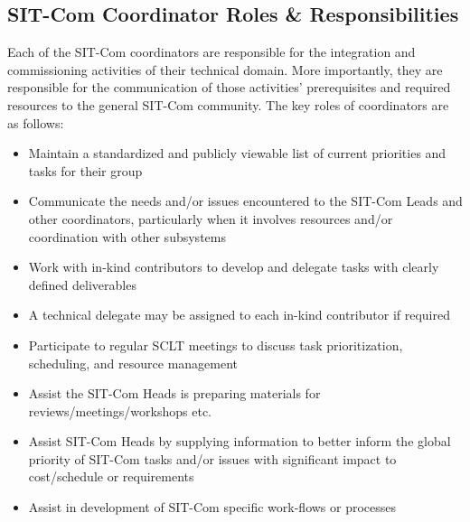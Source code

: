 \documentclass[SE,lsstdraft,authoryear,toc]{lsstdoc}
\begin{document}
\subsection{SIT-Com Coordinator Roles \& Responsibilities}
\label{sec:coordinator_r_and_rs}
Each of the SIT-Com coordinators are responsible for the integration and commissioning activities of their technical domain.
More importantly, they are responsible for the communication of those activities’ prerequisites and required resources to the general SIT-Com community.
The key roles of coordinators are as follows:
\begin{itemize}
    \item Maintain a standardized and publicly viewable list of current priorities and tasks for their group
    \item Communicate the needs and/or issues encountered to the SIT-Com Leads and other coordinators, particularly when it involves resources and/or coordination with other subsystems
    \item Work with in-kind contributors to develop and delegate tasks with clearly defined deliverables
    \item A technical delegate may be assigned to each in-kind contributor if required
    \item Participate to regular SCLT meetings to discuss task prioritization, scheduling, and resource management
    \item Assist the SIT-Com Heads is preparing materials for reviews/meetings/workshops etc.
    \item Assist SIT-Com Heads by supplying information to better inform the global priority of SIT-Com tasks and/or issues with significant impact to cost/schedule or requirements
    \item Assist in development of SIT-Com specific work-flows or processes
\end{itemize}
\end{document}
